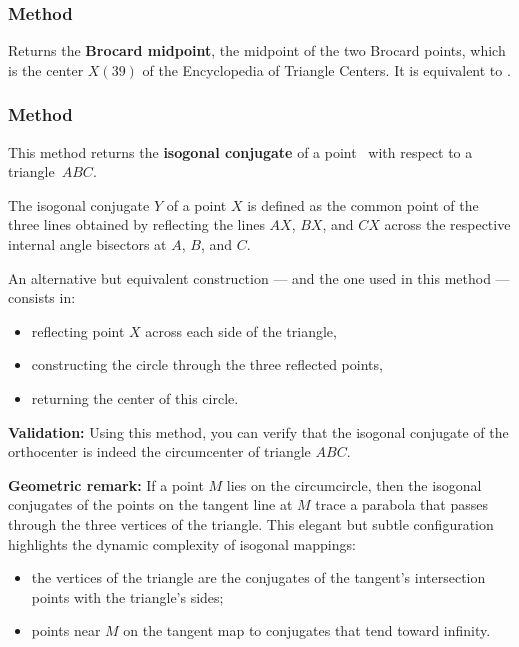 \subsubsection{Method }
\label{ssub:method_triangle_brocard_midpoint}

Returns the \textbf{Brocard midpoint}, the midpoint of the two Brocard points,
which is the center $X(39)$ of the Encyclopedia of Triangle Centers.
It is equivalent to .

\begin{tkzexample}
\end{tkzexample}

\subsubsection{Method } %
\label{ssub:method_triangle_isogonal}

This method returns the \textbf{isogonal conjugate} of a point~ with respect to a triangle~$ABC$.

\medskip

The isogonal conjugate $Y$ of a point $X$ is defined as the common point of the three lines obtained by reflecting the lines $AX$, $BX$, and $CX$ across the respective internal angle bisectors at $A$, $B$, and $C$.

\medskip

An alternative but equivalent construction — and the one used in this method — consists in:
\begin{itemize}
  \item reflecting point $X$ across each side of the triangle,
  \item constructing the circle through the three reflected points,
  \item returning the center of this circle.
\end{itemize}

\medskip

\textbf{Validation:} Using this method, you can verify that the isogonal conjugate of the orthocenter is indeed the circumcenter of triangle $ABC$.

\medskip

\textbf{Geometric remark:} If a point $M$ lies on the circumcircle, then the isogonal conjugates of the points on the tangent line at $M$ trace a parabola that passes through the three vertices of the triangle. This elegant but subtle configuration highlights the dynamic complexity of isogonal mappings:
\begin{itemize}
  \item the vertices of the triangle are the conjugates of the tangent's intersection points with the triangle’s sides;
  \item points near $M$ on the tangent map to conjugates that tend toward infinity.
\end{itemize}

